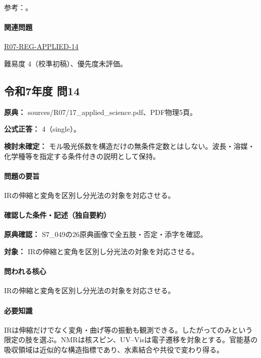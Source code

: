 \par 参考：\cite{analysis49_ir_ref,analysis49_beer_ref}。

\paragraph{関連問題} \hyperref[q:r07-reg-applied-14]{R07-REG-APPLIED-14}

\par 難易度 4（校準初稿）、優先度未評価。

\subsection{令和7年度 問14}
\label{q:r07-reg-applied-14}

\noindent\textbf{原典：} sources/R07/17\_applied\_science.pdf、PDF物理5頁。

\textbf{公式正答：} 4（single）。

\par\textbf{検討未確定：} モル吸光係数を構造だけの無条件定数とはしない。波長・溶媒・化学種等を指定する条件付きの説明として保持。

\paragraph{問題の要旨} IRの伸縮と変角を区別し分光法の対象を対応させる。

\paragraph{確認した条件・記述（独自要約）}\mbox{}\par

\noindent\textbf{原典確認：} S7\_049の26原典画像で全五肢・否定・添字を確認。\par

\noindent\textbf{対象：} IRの伸縮と変角を区別し分光法の対象を対応させる。\par

\paragraph{問われる核心} IRの伸縮と変角を区別し分光法の対象を対応させる。

\paragraph{必要知識} IRは伸縮だけでなく変角・曲げ等の振動も観測できる。したがってのみという限定の肢を選ぶ。NMRは核スピン、UV–Visは電子遷移を対象とする。官能基の吸収領域は近似的な構造指標であり、水素結合や共役で変わり得る。

